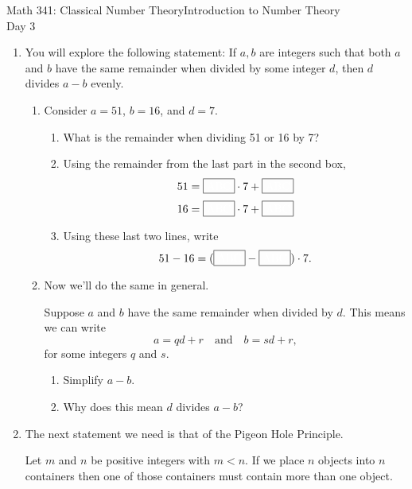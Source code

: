 \documentclass[12pt]{article}
\begin{document}
	\noindent Math 341: Classical Number Theory\hfill Introduction to Number Theory\\
	\mbox{}\hfill Day 3
	
	
	\begin{enumerate}
		\item You will explore the following statement: If $a,b$ are integers such that both $a$ and $b$ have the same remainder when divided by some integer $d$, then $d$ divides $a-b$ evenly.
		
		\begin{enumerate}
			\item Consider $a=51$, $b=16$, and $d=7$.  
				\begin{enumerate}
					\item What is the remainder when dividing 51 or 16 by 7?
					\item Using the remainder from the last part in the second box,
						$$51=\fbox{\color{white}ABC}\cdot7+\fbox{\color{white}ABC}$$
						$$16=\fbox{\color{white}ABC}\cdot7+\fbox{\color{white}ABC}$$
					\item Using these last two lines, write
						$$51-16=(\fbox{\color{white}ABC}-\fbox{\color{white}ABC})\cdot 7.$$
				\end{enumerate}
			\item Now we'll do the same in general.
				
				Suppose $a$ and $b$ have the same remainder when divided by $d$.  This means we can write
						$$a=qd+r\quad\text{and}\quad b=sd+r,$$ 
					for some integers $q$ and $s$.
				
				\begin{enumerate}
					\item Simplify $a-b$.\vskip 1in
					\item Why does this mean $d$ divides $a-b$?\vskip 1in
				\end{enumerate}
		\end{enumerate}
		\item The next statement we need is that of the Pigeon Hole Principle.
		
			Let $m$ and $n$ be positive integers with $m<n$. If we place $n$ objects into $n$ containers then one of those containers must contain more than one object.
			

\end{enumerate}
\end{document}

